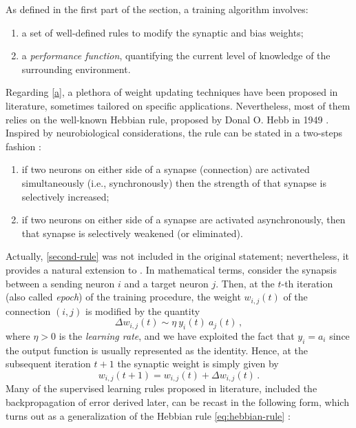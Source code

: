 \documentclass[12pt, a4paper, twoside, openright]{report}
\numberwithin{equation}{chapter}
\theoremstyle{theorem}
\theoremstyle{definition}
\theoremstyle{remark}
\theoremstyle{proposition}
\numberwithin{figure}{chapter}
\begin{document}
		As defined in the first part of the section, a training algorithm involves:
		\begin{enumerate}[label=(\alph*)]
			\item a set of well-defined rules to modify the synaptic and bias weights;
			\label{a}
			\item a \emph{performance function}, quantifying the current level of knowledge of the surrounding environment.
			\label{b}
		\end{enumerate}
		Regarding \ref{a}, a plethora of weight updating techniques have been proposed in literature, sometimes tailored on specific applications. Nevertheless, most of them relies on the well-known Hebbian rule, proposed by Donal O. Hebb in 1949 \cite{Heb49}. Inspired by neurobiological considerations, the rule can be stated in a two-steps fashion \cite{Hay05}:
		\begin{enumerate}[label=(\roman*)]
			\item if two neurons on either side of a synapse (connection) are activated simultaneously (i.e., synchronously) then the strength of that synapse is selectively increased;
			\label{first-rule}
			\item if two neurons on either side of a synapse are activated asynchronously, then that synapse is selectively weakened (or eliminated).
			\label{second-rule}
		\end{enumerate}
		Actually, \ref{second-rule} was not included in the original statement; nevertheless, it provides a natural extension to \label{first-rule} \cite{Hay05}.
		In mathematical terms, consider the synapsis between a sending neuron $i$ and a target neuron $j$. Then, at the $t$-th iteration (also called \emph{epoch}) of the training procedure, the weight $w_{i,j}(t)$ of the connection $(i,j)$ is modified by the quantity
		\begin{equation}
			\label{eq:hebbian-rule}
			\Delta w_{i,j}(t) \sim \eta ~ y_i(t) ~ a_j(t) \, ,
		\end{equation}
		where $\eta > 0$ is the \emph{learning rate}, and we have exploited the fact that $y_i = a_i$ since the output function is usually represented as the identity. Hence, at the subsequent iteration $t+1$ the synaptic weight is simply given by
		\begin{equation}
			\label{eq:weight-update}
			w_{i,j}(t+1) = w_{i,j}(t) + \Delta w_{i,j}(t) \, .
		\end{equation}
		Many of the supervised learning rules proposed in literature, included the backpropagation of error derived later, can be recast in the following form, which turns out as a generalization of the Hebbian rule \eqref{eq:hebbian-rule} \cite{Kri}:
\end{document}
